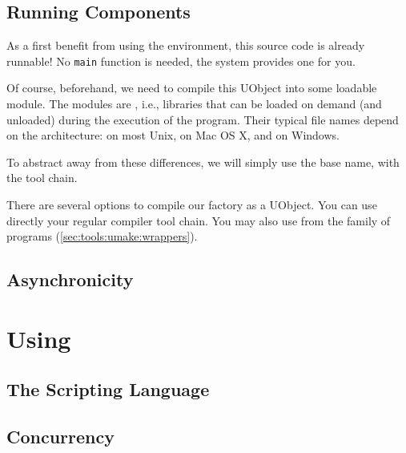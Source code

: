 \subsection{Running Components}
%


As a first benefit from using the \urbi environment, this source code
is already runnable!  No \lstinline|main| function is needed, the
\urbi system provides one for you.

Of course, beforehand, we need to compile this UObject into some
loadable module.  The \urbi modules are , i.e.,
libraries that can be loaded on demand (and unloaded) during the
execution of the program.  Their typical file names depend on the
architecture:  on most Unix, 
on Mac OS X, and  on Windows.

To abstract away from these differences, we will simply use the base
name,  with the \urbi tool chain.

There are several options to compile our factory as a UObject.  You
can use directly your regular compiler tool chain.  You may also use
 from the  family of programs
(\autoref{sec:tools:umake:wrappers}).


\subsection{Asynchronicity}


\section{Using \us}

\subsection{The \us Scripting Language}


\subsection{Concurrency}
%
%
%


